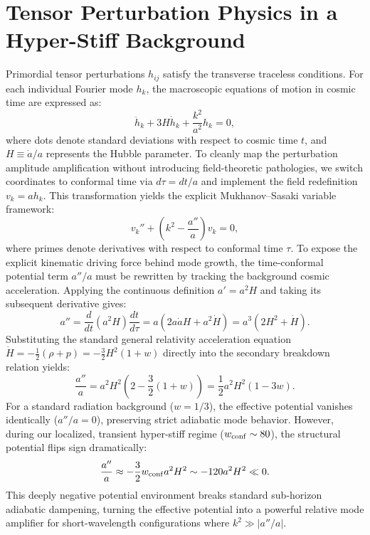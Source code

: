 \documentclass[twocolumn, PRD, amsmath, amssymb, aps, nofootinbib]{revtex4-2}
\begin{document}
\section{Tensor Perturbation Physics in a Hyper-Stiff Background}
Primordial tensor perturbations $h_{ij}$ satisfy the transverse traceless conditions. For each individual Fourier mode $h_k$, the macroscopic equations of motion in cosmic time are expressed as:
\begin{equation}
\ddot{h}_k + 3H\dot{h}_k + \frac{k^2}{a^2}h_k = 0,
\end{equation}
where dots denote standard deviations with respect to cosmic time $t$, and $H \equiv \dot{a}/a$ represents the Hubble parameter. To cleanly map the perturbation amplitude amplification without introducing field-theoretic pathologies, we switch coordinates to conformal time via $d\tau = dt/a$ and implement the field redefinition $v_k = a h_k$. This transformation yields the explicit Mukhanov--Sasaki variable framework:
\begin{equation}
v_k'' + \left(k^2 - \frac{a''}{a}\right)v_k = 0,
\end{equation}
where primes denote derivatives with respect to conformal time $\tau$. To expose the explicit kinematic driving force behind mode growth, the time-conformal potential term $a''/a$ must be rewritten by tracking the background cosmic acceleration. Applying the continuous definition $a' = a^2 H$ and taking its subsequent derivative gives:
\begin{equation}
a'' = \frac{d}{dt}(a^2 H) \frac{dt}{d\tau} = a \left( 2a\dot{a}H + a^2 \dot{H} \right) = a^3 \left( 2H^2 + \dot{H} \right).
\end{equation}
Substituting the standard general relativity acceleration equation $\dot{H} = -\frac{1}{2}(\rho + p) = -\frac{3}{2}H^2(1+w)$ directly into the secondary breakdown relation yields:
\begin{equation}
\frac{a''}{a} = a^2 H^2 \left( 2 - \frac{3}{2}(1+w) \right) = \frac{1}{2}a^2 H^2 (1 - 3w).
\end{equation}
For a standard radiation background ($w = 1/3$), the effective potential vanishes identically ($a''/a = 0$), preserving strict adiabatic mode behavior. However, during our localized, transient hyper-stiff regime ($w_{\rm conf} \sim 80$), the structural potential flips sign dramatically:
\begin{equation}
\frac{a''}{a} \approx -\frac{3}{2}w_{\rm conf} a^2 H^2 \sim -120 a^2 H^2 \ll 0.
\end{equation}
This deeply negative potential environment breaks standard sub-horizon adiabatic dampening, turning the effective potential into a powerful relative mode amplifier for short-wavelength configurations where $k^2 \gg |a''/a|$.
\end{document}
